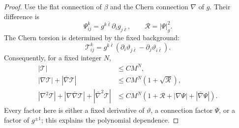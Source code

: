\begin{proof}
Use the flat connection of $\beta$ and the Chern connection $\nabla$ of $g$. Their difference is
\[
  \Psi^k_{ij}=g^{k\bar\ell}\partial_i g_{j\bar\ell},
  \qquad \mathcal R=|\Psi|_g^2.
\]
The Chern torsion is determined by the fixed background:
\begin{equation}\label{eq:interior-torsion-background}
  \mathcal T^k_{ij}
  =g^{k\bar\ell}(\partial_i\vartheta_{j\bar\ell}-\partial_j\vartheta_{i\bar\ell}).
\end{equation}
Consequently, for a fixed integer $N$,
\begin{align}
  |\mathcal T|&\leq CM^N,\nonumber\\
  |\nabla\mathcal T|+|\bar\nabla\mathcal T|
  &\leq CM^N(1+\sqrt{\mathcal R}),\label{eq:interior-torsion-derivatives}\\
  |\nabla^2\mathcal T|+|\nabla\bar\nabla\mathcal T|+|\bar\nabla^2\mathcal T|
  &\leq CM^N(1+\mathcal R+|\nabla\Psi|+|\bar\nabla\Psi|).\nonumber
\end{align}
Every factor here is either a fixed derivative of $\vartheta$, a connection factor $\Psi$, or a factor of $g^{\pm1}$; this explains the polynomial dependence.


\end{proof}
